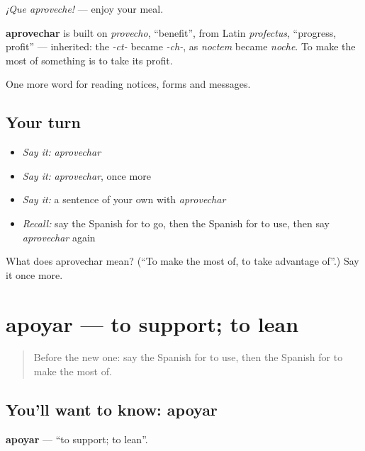 \emph{¡Que aproveche!} — enjoy your meal.

\begin{cousinweb}
\textbf{aprovechar} is built on \emph{provecho}, \textquotedblleft{}benefit\textquotedblright{}, from Latin \emph{profectus}, \textquotedblleft{}progress, profit\textquotedblright{} — inherited: the \emph{-ct-} became \emph{-ch-}, as \emph{noctem} became \emph{noche}. To make the most of something is to take its profit.
\end{cousinweb}

\begin{grammarlens}[title={What you've built}]
One more word for reading notices, forms and messages.
\end{grammarlens}

\subsection*{Your turn}
\begin{itemize}
\raggedright
  \item \emph{Say it:} \emph{aprovechar}
  \item \emph{Say it:} \emph{aprovechar}, once more
  \item \emph{Say it:} a sentence of your own with \emph{aprovechar}
  \item \emph{Recall:} say the Spanish for to go, then the Spanish for to use, then say \emph{aprovechar} again
\end{itemize}

\begin{tcolorbox}[breakable,colback=teal!4,colframe=teal!35!black,title={Before you move on}]
What does aprovechar mean? (\textquotedblleft{}To make the most of, to take advantage of\textquotedblright{}.) Say it once more.
\end{tcolorbox}
\section[apoyar]{apoyar — to support; to lean}

\label{lesson:ES-C484-apoyar}



\begin{quote}
Before the new one: say the Spanish for to use, then the Spanish for to make the most of.
\end{quote}

\subsection*{You'll want to know: apoyar}
\textbf{apoyar} — \textquotedblleft{}to support; to lean\textquotedblright{}.

